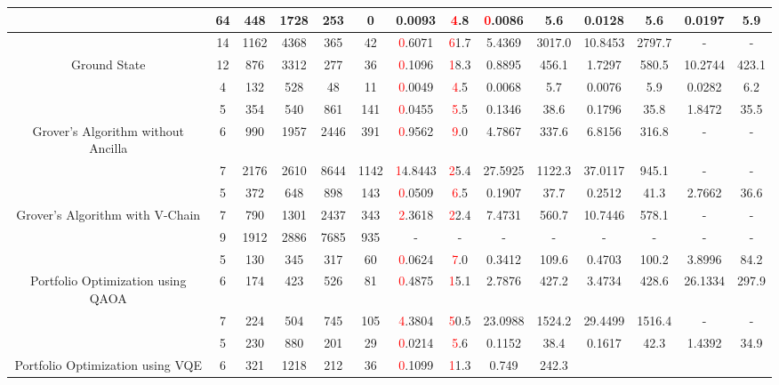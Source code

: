 \begin{table}[htb]
{\begin{tabular}{|c|c|c|c|c|c|c|c|c|c|c|c|c|c|}
 & 
64 & 448 & 1728 & 253 & 0
 & 0.0093 & \textcolor{red}4.8
 & \textcolor{red}0.0086 & 5.6
 & 0.0128 & 5.6
 & 0.0197 & 5.9
 \\
\hline
 & 
14 & 1162 & 4368 & 365 & 42
 & \textcolor{red}0.6071 & \textcolor{red}61.7
 & 5.4369 & 3017.0
 & 10.8453 & 2797.7
 & - & -
 \\
Ground State & 
12 & 876 & 3312 & 277 & 36
 & \textcolor{red}0.1096 & \textcolor{red}18.3
 & 0.8895 & 456.1
 & 1.7297 & 580.5
 & 10.2744 & 423.1
 \\
 & 
4 & 132 & 528 & 48 & 11
 & \textcolor{red}0.0049 & \textcolor{red}4.5
 & 0.0068 & 5.7
 & 0.0076 & 5.9
 & 0.0282 & 6.2
 \\
\hline
 & 
5 & 354 & 540 & 861 & 141
 & \textcolor{red}0.0455 & \textcolor{red}5.5
 & 0.1346 & 38.6
 & 0.1796 & 35.8
 & 1.8472 & 35.5
 \\
Grover's Algorithm without Ancilla & 
6 & 990 & 1957 & 2446 & 391
 & \textcolor{red}0.9562 & \textcolor{red}9.0
 & 4.7867 & 337.6
 & 6.8156 & 316.8
 & - & -
 \\
 & 
7 & 2176 & 2610 & 8644 & 1142
 & \textcolor{red}14.8443 & \textcolor{red}25.4
 & 27.5925 & 1122.3
 & 37.0117 & 945.1
 & - & -
 \\
\hline
 & 
5 & 372 & 648 & 898 & 143
 & \textcolor{red}0.0509 & \textcolor{red}6.5
 & 0.1907 & 37.7
 & 0.2512 & 41.3
 & 2.7662 & 36.6
 \\
Grover's Algorithm with V-Chain & 
7 & 790 & 1301 & 2437 & 343
 & \textcolor{red}2.3618 & \textcolor{red}22.4
 & 7.4731 & 560.7
 & 10.7446 & 578.1
 & - & -
 \\
 & 
9 & 1912 & 2886 & 7685 & 935
 & - & -
 & - & -
 & - & -
 & - & -
 \\
\hline
 & 
5 & 130 & 345 & 317 & 60
 & \textcolor{red}0.0624 & \textcolor{red}7.0
 & 0.3412 & 109.6
 & 0.4703 & 100.2
 & 3.8996 & 84.2
 \\
Portfolio Optimization using QAOA & 
6 & 174 & 423 & 526 & 81
 & \textcolor{red}0.4875 & \textcolor{red}15.1
 & 2.7876 & 427.2
 & 3.4734 & 428.6
 & 26.1334 & 297.9
 \\
 & 
7 & 224 & 504 & 745 & 105
 & \textcolor{red}4.3804 & \textcolor{red}50.5
 & 23.0988 & 1524.2
 & 29.4499 & 1516.4
 & - & -
 \\
\hline
 & 
5 & 230 & 880 & 201 & 29
 & \textcolor{red}0.0214 & \textcolor{red}5.6
 & 0.1152 & 38.4
 & 0.1617 & 42.3
 & 1.4392 & 34.9
 \\
Portfolio Optimization using VQE & 
6 & 321 & 1218 & 212 & 36
 & \textcolor{red}0.1099 & \textcolor{red}11.3
 & 0.749 & 242.3

\end{tabular}}
\end{table}
